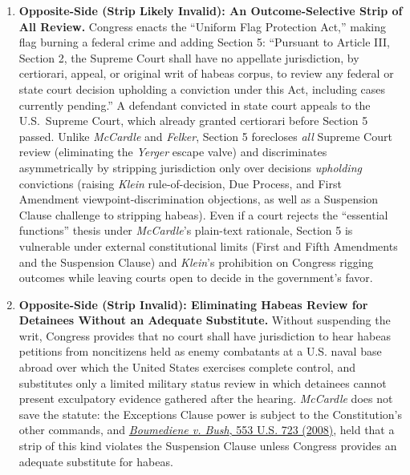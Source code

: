 \documentclass[12pt]{article}
\begin{document}
\begin{enumerate}
\item \textbf{Opposite-Side (Strip Likely Invalid): An Outcome-Selective Strip of All Review.} Congress enacts the ``Uniform Flag Protection Act,'' making flag burning a federal crime and adding Section 5: ``Pursuant to Article III, Section 2, the Supreme Court shall have no appellate jurisdiction, by certiorari, appeal, or original writ of habeas corpus, to review any federal or state court decision upholding a conviction under this Act, including cases currently pending.'' A defendant convicted in state court appeals to the U.S.\ Supreme Court, which already granted certiorari before Section 5 passed. Unlike \textit{McCardle} and \textit{Felker}, Section 5 forecloses \emph{all} Supreme Court review (eliminating the \textit{Yerger} escape valve) and discriminates asymmetrically by stripping jurisdiction only over decisions \emph{upholding} convictions (raising \textit{Klein} rule-of-decision, Due Process, and First Amendment viewpoint-discrimination objections, as well as a Suspension Clause challenge to stripping habeas). Even if a court rejects the ``essential functions'' thesis under \textit{McCardle}'s plain-text rationale, Section 5 is vulnerable under external constitutional limits (First and Fifth Amendments and the Suspension Clause) and \textit{Klein}'s prohibition on Congress rigging outcomes while leaving courts open to decide in the government's favor.

\item \textbf{Opposite-Side (Strip Invalid): Eliminating Habeas Review for Detainees Without an Adequate Substitute.} Without suspending the writ, Congress provides that no court shall have jurisdiction to hear habeas petitions from noncitizens held as enemy combatants at a U.S. naval base abroad over which the United States exercises complete control, and substitutes only a limited military status review in which detainees cannot present exculpatory evidence gathered after the hearing. \textit{McCardle} does not save the statute: the Exceptions Clause power is subject to the Constitution's other commands, and \href{https://supreme.justia.com/cases/federal/us/553/723/}{\textit{Boumediene v. Bush}, 553 U.S. 723 (2008)}, held that a strip of this kind violates the Suspension Clause unless Congress provides an adequate substitute for habeas.


\end{enumerate}
\end{document}
